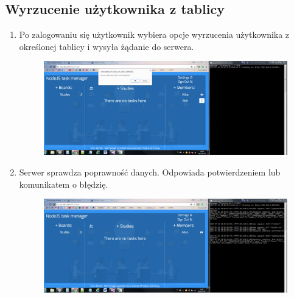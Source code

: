 \documentclass[12pt]{report}
\begin{document}
\begin{enumerate}
\begin{enumerate}
\begin{enumerate}
\subsection{Wyrzucenie użytkownika z tablicy}
\begin{enumerate}
\item Po zalogowaniu się użytkownik wybiera opcje wyrzucenia użytkownika z określonej tablicy i wysyła żądanie do serwera.
\begin{figure}[!t]
\centering
\includegraphics{91.png}
\end{figure}
\item Serwer sprawdza poprawność danych. Odpowiada potwierdzeniem lub komunikatem o błędzię.
\begin{figure}[!t]
\centering
\includegraphics{92.png}
\end{figure}
\end{enumerate}


\end{enumerate}
\end{enumerate}
\end{enumerate}
\end{document}
